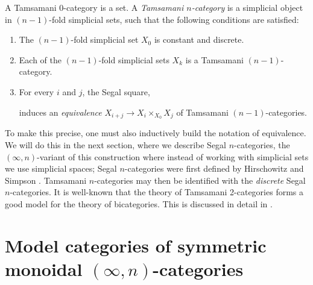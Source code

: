 \documentclass{amsart}
\begin{document}
\begin{definition}[Sketch]
	A Tamsamani $0$-category is a set. 	A {\em Tamsamani $n$-category} is a simplicial object in $(n-1)$-fold simplicial sets, such that the following conditions are satisfied: 
	\begin{enumerate}
		\item The $(n-1)$-fold simplicial set $X_0$ is constant and discrete.
		\item Each of the $(n-1)$-fold simplicial sets $X_k$ is a Tamsamani $(n-1)$-category.
		\item For every $i$ and $j$, the Segal square,
		\begin{center}
		\end{center}
		induces an {\em equivalence} $X_{i+j} \to X_i \times_{X_0} X_j$ of Tamsamani $(n-1)$-categories.
	\end{enumerate}
\end{definition} 

\noindent To make this precise, one must also inductively build the notation of equivalence. We will do this in the next section, where we describe Segal $n$-categories, the $(\infty,n)$-variant of this construction where instead of working with simplicial sets we use simplicial spaces; Segal $n$-categories were first defined by Hirschowitz and Simpson \cite{9807049}. Tamsamani $n$-categories may then be identified with the {\em discrete} Segal $n$-categories.  It is well-known that the theory of Tamsamani 2-categories forms a good model for the theory of bicategories. This is discussed in detail in \cite{MR2366560}.


\section{Model categories of symmetric monoidal $(\infty,n)$-categories} \label{sec-symmoninftyNcat}
\end{document}
